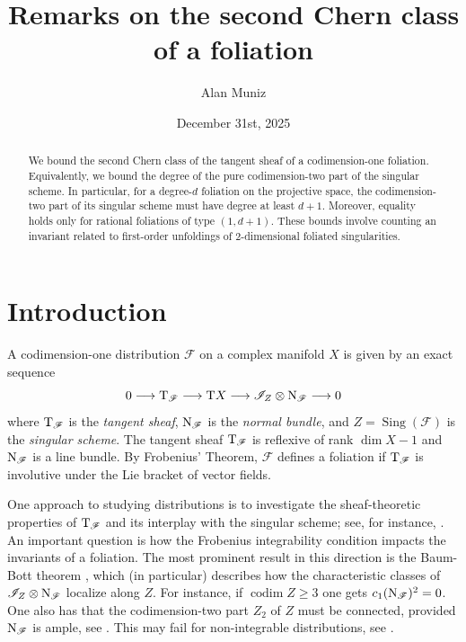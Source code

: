 \documentclass[a4paper, 11pt]{amsart}
\title{Remarks on the second Chern class of a foliation}
\author[A. Muniz]{Alan Muniz}
\date{December 31st, 2025}
\theoremstyle{plain}
\numberwithin{theorem}{section}
\theoremstyle{definition}
\DeclareMathOperator{\codim}{{codim}}
\DeclareMathOperator{\sing}{Sing}
\newcommand{\lra}{\longrightarrow}
\newcommand{\pn}{{\mathbb{P}^{n}}}
\newcommand{\sF}{\mathscr{F}}
\newcommand{\sI}{\mathscr{I}}
\newcommand{\tF}{{\rm T}_\mathscr{F}}
\newcommand{\nF}{{\rm N}_\mathscr{F}}
\newcommand{\tX}{{\rm T}X}
\begin{document}
\begin{abstract}
We bound the second Chern class of the tangent sheaf of a codimension-one foliation. Equivalently, we bound the degree of the pure codimension-two part of the singular scheme. In particular, for a degree-$d$ foliation on the projective space, the codimension-two part of its singular scheme must have degree at least $d+1$. Moreover, equality holds only for rational foliations of type $(1,d+1)$. These bounds involve counting an invariant related to first-order unfoldings of 2-dimensional foliated singularities.  
\end{abstract}

\maketitle

\section{Introduction}
A codimension-one distribution $\sF$ on a complex manifold $X$ is given by an exact sequence
\[
0 \lra \tF \lra \tX \lra \sI_Z\otimes \nF \lra 0
\]
where $\tF$ is the \emph{tangent sheaf}, $\nF$ is the \emph{normal bundle}, and $Z = \sing(\sF)$ is the \emph{singular scheme}. The tangent sheaf $\tF$ is reflexive of rank $\dim X -1$ and $\nF$ is a line bundle. By Frobenius' Theorem, $\sF$ defines a foliation if $\tF$ is involutive under the Lie bracket of vector fields. 

One approach to studying distributions is to investigate the sheaf-theoretic properties of $\tF$ and its interplay with the singular scheme; see, for instance, \cite{artigao, CJM-deg1, GJM-deg2,CCM-3folds}. An important question is how the Frobenius integrability condition impacts the invariants of a foliation. The most prominent result in this direction is the Baum-Bott theorem \cite{BB}, which (in particular) describes how the characteristic classes of $\sI_Z\otimes \nF$ localize along $Z$. For instance, if $\codim Z \geq 3$ one gets  $c_1(\nF)^2 = 0$. One also has that the codimension-two part $Z_2$ of $Z$ must be connected, provided $\nF$ is ample, see \cite{CMJS}. This may fail for non-integrable distributions, see \cite[Example 4.6]{M-pforms}. 
\end{document}

